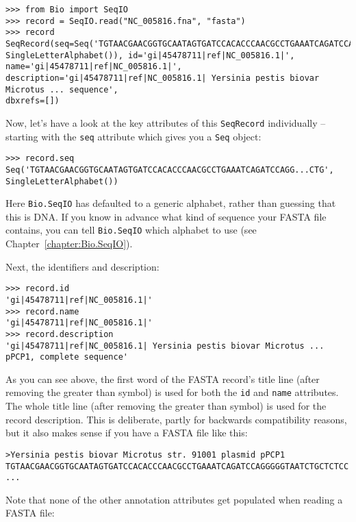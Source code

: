 \documentclass{report}
\begin{document}
\begin{verbatim}
>>> from Bio import SeqIO
>>> record = SeqIO.read("NC_005816.fna", "fasta")
>>> record
SeqRecord(seq=Seq('TGTAACGAACGGTGCAATAGTGATCCACACCCAACGCCTGAAATCAGATCCAGG...CTG',
SingleLetterAlphabet()), id='gi|45478711|ref|NC_005816.1|', name='gi|45478711|ref|NC_005816.1|',
description='gi|45478711|ref|NC_005816.1| Yersinia pestis biovar Microtus ... sequence',
dbxrefs=[])
\end{verbatim}

Now, let's have a look at the key attributes of this \verb|SeqRecord|
individually -- starting with the \verb|seq| attribute which gives you a
\verb|Seq| object:

\begin{verbatim}
>>> record.seq
Seq('TGTAACGAACGGTGCAATAGTGATCCACACCCAACGCCTGAAATCAGATCCAGG...CTG', SingleLetterAlphabet())
\end{verbatim}

\noindent Here \verb|Bio.SeqIO| has defaulted to a generic alphabet, rather
than guessing that this is DNA. If you know in advance what kind of sequence
your FASTA file contains, you can tell \verb|Bio.SeqIO| which alphabet to use
(see Chapter~\ref{chapter:Bio.SeqIO}).

Next, the identifiers and description:

\begin{verbatim}
>>> record.id
'gi|45478711|ref|NC_005816.1|'
>>> record.name
'gi|45478711|ref|NC_005816.1|'
>>> record.description
'gi|45478711|ref|NC_005816.1| Yersinia pestis biovar Microtus ... pPCP1, complete sequence'
\end{verbatim}

As you can see above, the first word of the FASTA record's title line (after
removing the greater than symbol) is used for both the \verb|id| and
\verb|name| attributes. The whole title line (after removing the greater than
symbol) is used for the record description. This is deliberate, partly for
backwards compatibility reasons, but it also makes sense if you have a FASTA
file like this:

\begin{verbatim}
>Yersinia pestis biovar Microtus str. 91001 plasmid pPCP1
TGTAACGAACGGTGCAATAGTGATCCACACCCAACGCCTGAAATCAGATCCAGGGGGTAATCTGCTCTCC
...
\end{verbatim}

Note that none of the other annotation attributes get populated when reading a
FASTA file:
\end{document}
